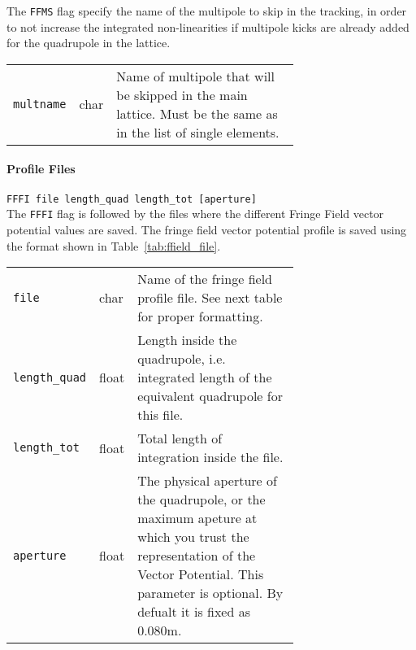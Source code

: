 The \texttt{FFMS} flag specify the name of the multipole to skip in the tracking, in order to not increase the integrated non-linearities if multipole kicks are already added for the quadrupole in the lattice.

\bigskip
\begin{tabular}{@{}llp{0.7\linewidth}}
    \texttt{multname} & char & Name of multipole that will be skipped in the main lattice. Must be the same as in the list of single elements.
\end{tabular}

\paragraph{Profile Files} \texttt{FFFI file length\_quad length\_tot [aperture]}\\

The \texttt{FFFI} flag is followed by the files where the different Fringe Field vector potential values are saved.
The fringe field vector potential profile is saved using the format shown in Table~\ref{tab:ffield_file}.

\bigskip
\begin{tabular}{@{}llp{0.7\linewidth}}
    \texttt{file}         & char  & Name of the fringe field profile file. See next table for proper formatting. \\
    \texttt{length\_quad} & float & Length inside the quadrupole, i.e. integrated length of the equivalent quadrupole for this file. \\
    \texttt{length\_tot}  & float & Total length of integration inside the file. \\
    \texttt{aperture}     & float & The physical aperture of the quadrupole, or the maximum apeture at which you trust the representation of the Vector Potential. This parameter is optional. By defualt it is fixed as 0.080m.
\end{tabular}

